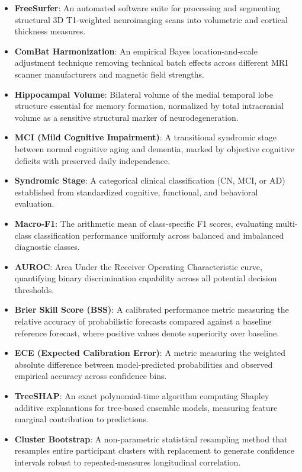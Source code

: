 \documentclass[11pt,a4paper]{article}
\begin{document}
\begin{itemize}
    \item \textbf{FreeSurfer}: An automated software suite for processing and segmenting structural 3D T1-weighted neuroimaging scans into volumetric and cortical thickness measures.
    \item \textbf{ComBat Harmonization}: An empirical Bayes location-and-scale adjustment technique removing technical batch effects across different MRI scanner manufacturers and magnetic field strengths.
    \item \textbf{Hippocampal Volume}: Bilateral volume of the medial temporal lobe structure essential for memory formation, normalized by total intracranial volume as a sensitive structural marker of neurodegeneration.
    \item \textbf{MCI (Mild Cognitive Impairment)}: A transitional syndromic stage between normal cognitive aging and dementia, marked by objective cognitive deficits with preserved daily independence.
    \item \textbf{Syndromic Stage}: A categorical clinical classification (CN, MCI, or AD) established from standardized cognitive, functional, and behavioral evaluation.
    \item \textbf{Macro-F1}: The arithmetic mean of class-specific F1 scores, evaluating multi-class classification performance uniformly across balanced and imbalanced diagnostic classes.
    \item \textbf{AUROC}: Area Under the Receiver Operating Characteristic curve, quantifying binary discrimination capability across all potential decision thresholds.
    \item \textbf{Brier Skill Score (BSS)}: A calibrated performance metric measuring the relative accuracy of probabilistic forecasts compared against a baseline reference forecast, where positive values denote superiority over baseline.
    \item \textbf{ECE (Expected Calibration Error)}: A metric measuring the weighted absolute difference between model-predicted probabilities and observed empirical accuracy across confidence bins.
    \item \textbf{TreeSHAP}: An exact polynomial-time algorithm computing Shapley additive explanations for tree-based ensemble models, measuring feature marginal contribution to predictions.
    \item \textbf{Cluster Bootstrap}: A non-parametric statistical resampling method that resamples entire participant clusters with replacement to generate confidence intervals robust to repeated-measures longitudinal correlation.
\end{itemize}
\end{document}
